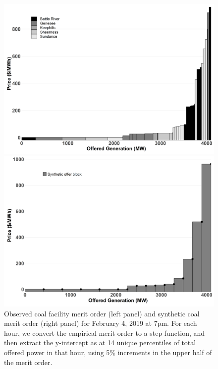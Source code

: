 \documentclass[12pt]{article}
\begin{document}
\begin{figure}[t]
    \centering
    \begin{minipage}{.5\textwidth}
        \centering
        \includegraphics[width=.9\textwidth]{../images/coal_merit.png}
    \end{minipage}%
    \begin{minipage}{0.5\textwidth}
        \centering
        \includegraphics[width=.9\textwidth]{../images/coal_synth_merit}
    \end{minipage}
    \caption{Observed coal facility merit order (left panel) and synthetic coal merit order (right panel) for February 4, 2019 at 7pm. For each hour, we convert the empirical merit order to a step function, and then extract the y-intercept as at 14 unique percentiles of total offered power in that hour, using 5\% increments in the upper half of the merit order.}
    \label{fig:synth_merit}
\end{figure}
\end{document}
